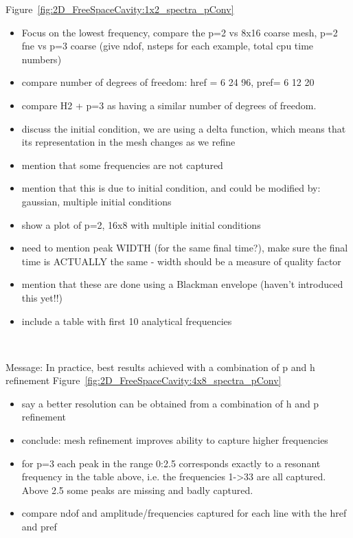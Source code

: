 Figure~\ref{fig:2D_FreeSpaceCavity:1x2_spectra_pConv}
\begin{itemize}
\item Focus on the lowest frequency, compare the p=2 vs 8x16 coarse
  mesh, p=2 fne vs p=3 coarse (give ndof, nsteps for each example, total cpu time numbers)
\item compare number of degrees of freedom: href = 6    24    96, pref= 6 12 20
\item compare H2 + p=3 as having a similar number of degrees of freedom.
\item discuss the initial condition, we are using a delta function, which means that its representation in the mesh changes as we refine
\item mention that some frequencies are not captured
\item mention that this is due to initial condition, and could be modified by: gaussian, multiple initial conditions
\item show a plot of p=2, 16x8 with multiple initial conditions
\item need to mention peak WIDTH (for the same final time?), make sure the final time is ACTUALLY the same - width should be a measure of quality factor
\item mention that these are done using a Blackman envelope (haven't introduced this yet!!)
\item include a table with first 10 analytical frequencies
\end{itemize}

\begin{figure}[!ht]
	\centering
   \\
\end{figure}

Message: In practice, best results achieved with a combination of p and h refinement
Figure~\ref{fig:2D_FreeSpaceCavity:4x8_spectra_pConv}
\begin{itemize}
\item say a better resolution can be obtained from a combination of h and p refinement
\item conclude: mesh refinement improves ability to capture higher frequencies
\item for p=3 each peak in the range 0:2.5 corresponds exactly to a resonant frequency in the table above, i.e. the frequencies 1->33 are all captured. Above 2.5 some peaks are missing and badly captured.
\item compare ndof and amplitude/frequencies captured for each line with the href and pref
\end{itemize}

